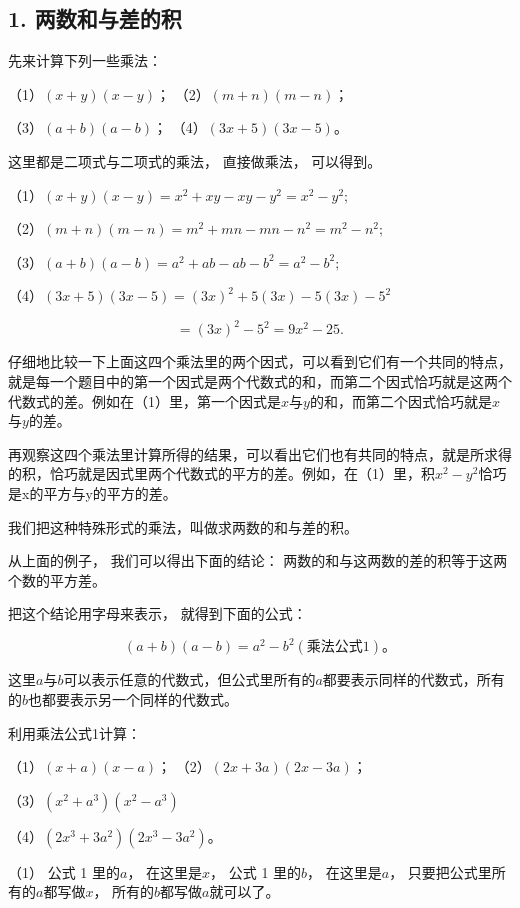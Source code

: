 \subsection{1. 两数和与差的积}

先来计算下列一些乘法：

（1）\((x + y)(x - y)\)； （2）\((m + n)(m - n)\)；

（3）\((a + b)(a - b)\)； （4）\((3x + 5)(3x - 5)\)。

这里都是二项式与二项式的乘法， 直接做乘法， 可以得到。

（1）\((x + y)(x - y) = x^2 + xy - xy - y^2 = x^2 - y^2;\)

（2）\((m + n)(m - n) = m^2 + mn - mn - n^2 = m^2 - n^2;\)

（3）\((a + b)(a - b) = a^2 + ab - ab - b^2 = a^2 - b^2;\)

（4）\((3x + 5)(3x - 5) = (3x)^2 + 5(3x) - 5(3x) - 5^2\)

\[
= (3 x) ^{2} - 5 ^{2} = 9 x ^{2} - 25.
\]

仔细地比较一下上面这四个乘法里的两个因式，可以看到它们有一个共同的特点，就是每一个题目中的第一个因式是两个代数式的和，而第二个因式恰巧就是这两个代数式的差。例如在（1）里，第一个因式是\(x\)与\(y\)的和，而第二个因式恰巧就是\(x\)与\(y\)的差。

再观察这四个乘法里计算所得的结果，可以看出它们也有共同的特点，就是所求得的积，恰巧就是因式里两个代数式的平方的差。例如，在（1）里，积\(x^{2}-y^{2}\)恰巧是x的平方与y的平方的差。

我们把这种特殊形式的乘法，叫做求两数的和与差的积。

从上面的例子， 我们可以得出下面的结论：
两数的和与这两数的差的积等于这两个数的平方差。

把这个结论用字母来表示， 就得到下面的公式：

\[
(a + b) (a - b) = a ^{2} - b ^{2} (\text{乘法公式} 1)\text{。}
\]

这里\(a\)与\(b\)可以表示任意的代数式，但公式里所有的\(a\)都要表示同样的代数式，所有的\(b\)也都要表示另一个同样的代数式。

 利用乘法公式1计算：

（1）\((x + a)(x - a)\)； （2）\((2x + 3a)(2x - 3a)\)；

（3）\((x^{2} + a^{3})(x^{2} - a^{3})\)

（4）\((2x^{3} + 3a^{2})(2x^{3} - 3a^{2})\)。

 （1） 公式 1 里的\(a\)， 在这里是\(x\)， 公式 1
里的\(b\)， 在这里是\(a\)， 只要把公式里所有的\(a\)都写做\(x\)，
所有的\(b\)都写做\(a\)就可以了。

